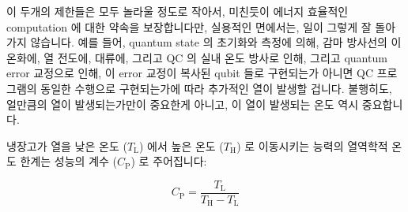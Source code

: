 이 두개의 제한들은 모두 놀라울 정도로 작아서, 미친듯이 에너지 효율적인
computation 에 대한 약속을 보장합니다만, 실용적인 면에서는, 일이 그렇게 잘
돌아가지 않습니다.
예를 들어, quantum state 의 초기화와 측정에 의해, 감마 방사선의 이온화에, 열
전도에, 대류에, 그리고 QC 의 실내 온도 방사로 인해, 그리고 quantum error
교정으로 인해, 이 error 교정이 복사된 qubit 들로 구현되는가 아니면 QC
프로그램의 동일한 수행으로 구현되는가에 따라 추가적인 열이 발생할 겁니다.
불행히도, 얼만큼의 열이 발생되는가만이 중요한게 아니고, 이 열이 발생되는 온도
역시 중요합니다.

\newcommand{\TLo}{T_\mathrm{L}}
\newcommand{\THi}{T_\mathrm{H}}
\newcommand{\CPf}{C_\mathrm{P}}

냉장고가 열을 낮은 온도 ($\TLo$) 에서 높은 온도 ($\THi$) 로 이동시키는 능력의
열역학적 온도 한계는 성능의 계수 ($\CPf$) 로 주어집니다:

\begin{equation}
	\CPf = \frac{\TLo}{\THi - \TLo}
\end{equation}

